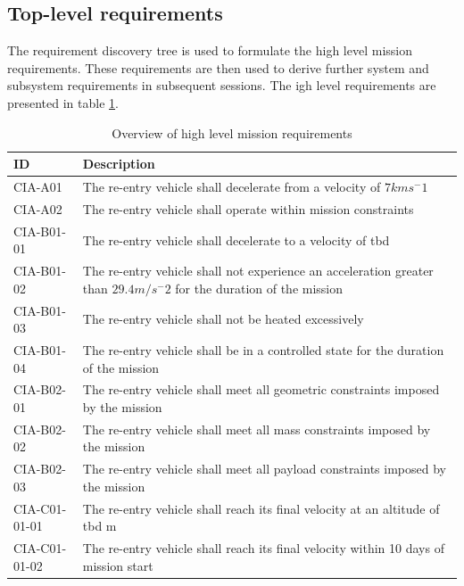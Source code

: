 \subsection{Top-level requirements}
The requirement discovery tree is used to formulate the high level mission requirements. These requirements are then used to derive further system and subsystem requirements in subsequent sessions. The igh level requirements are presented in table \ref{tab:toplevelreq}.

\begin{table}[H]
	\caption{Overview of high level mission requirements}
	\begin{tabular}{|p{}|p{}|}
    \hline
    ID          & Description                                                                                                      \\ \hline \hline
    CIA-A01 & The re-entry vehicle shall decelerate from a velocity of $7kms^-1$ \\ \hline
    CIA-A02 & The re-entry vehicle shall operate within mission constraints                                               \\ \hline
    CIA-B01-01 & The re-entry vehicle shall decelerate to a velocity of \gls{tbd}     
\\ \hline
    CIA-B01-02 & The re-entry vehicle shall not experience an acceleration greater than $29.4 m/s^-2	$ for the duration of the mission			\\ \hline
    CIA-B01-03 & The re-entry vehicle shall not be heated excessively  \\ \hline
    CIA-B01-04 & The re-entry vehicle shall be in a controlled state for the duration of the mission                            \\ \hline
    CIA-B02-01 & The re-entry vehicle shall meet all geometric constraints imposed by the mission                           \\ \hline
    CIA-B02-02 & The re-entry vehicle shall meet all mass constraints imposed by the mission                                      \\ \hline
	CIA-B02-03 & The re-entry vehicle shall meet all payload constraints imposed by the mission 
\\ \hline
		CIA-C01-01-01 & The re-entry vehicle shall reach its final velocity at an altitude of \gls{tbd} m 
\\ \hline
		CIA-C01-01-02 & The re-entry vehicle shall reach its final velocity within 10 days of mission start 
\\ \hline
    \end{tabular}
    \label{tab:toplevelreq}
\end{table}












